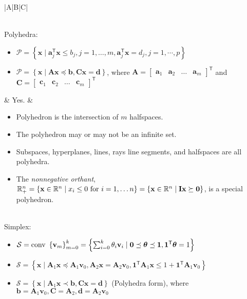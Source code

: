 \documentclass{article}
\newcommand{\trans}{\mathsf{T}}
\begin{document}
\begin{table}
\begin{tabularx}{\textwidth}{|A|B|C|}
\begin{itemize}[leftmargin=*]
\end{itemize} \\
\hline
Polyhedra:
\begin{itemize}[leftmargin=*]
    \item $\mathcal{P} = \left\{ \mathbf{x} \mid \mathbf{a}_j^\trans \mathbf{x} \leq b_j, j=1, \dots, m, \mathbf{a}_j^\trans \mathbf{x} = d_j, j=1,\cdots, p  \right\}$
    \item \(\mathcal{P} = \left\{ \mathbf{x} \mid \mathbf{Ax} \preceq \mathbf{b}, \mathbf{Cx} = \mathbf{d} \right\}\), where \(\mathbf{A} = \begin{bmatrix}
            \mathbf{a}_1 & \mathbf{a}_2 & \dots & \mathbf{a}_m
        \end{bmatrix}^\trans\) and \(\mathbf{C} = \begin{bmatrix}
            \mathbf{c}_1 & \mathbf{c}_2 & \dots & \mathbf{c}_m
        \end{bmatrix}^\trans\)
\end{itemize} & Yes. &
\begin{itemize}[leftmargin=*]
    \item Polyhedron is the intersection of \(m\) halfspaces.
    \item The polyhedron may or may not be an infinite set.
    \item Subspaces, hyperplanes, lines, rays line segments, and
    halfspaces are all polyhedra.
    \item The \emph{nonnegative orthant}, \(\mathbb{R}_{+}^{n} = \left\{ \mathbf{x} \in \mathbb{R}^n \mid x_i \leq 0 \textnormal{ for } i=1,\dots n \right\} = \left\{ \mathbf{x} \in \mathbb{R}^n \mid \mathbf{Ix}  \succeq \mathbf{0}\right\}\), is a special polyhedron.
\end{itemize}\\
\hline
Simplex:
\begin{itemize}[leftmargin=*]
    \item \(\mathcal{S} = \textnormal{conv }\left\{ \mathbf{v}_m \right\}_{m=0}^{k} = \left\{ \sum_{i=0}^{k} \theta_i \mathbf{v}_i \mid \mathbf{0} \preceq \boldsymbol{\theta} \preceq \mathbf{1}, \mathbf{1}^\trans \boldsymbol{\theta} = 1 \right\}\)
    \item \(\mathcal{S} = \left\{ \mathbf{x} \mid \mathbf{A}_1 \mathbf{x} \preceq \mathbf{A}_1 \mathbf{v}_0, \mathbf{A}_2 \mathbf{x} = \mathbf{A}_2 \mathbf{v}_0, \mathbf{1}^\trans \mathbf{A}_1 \mathbf{x} \leq 1 + \mathbf{1}^\trans\mathbf{A}_1 \mathbf{v}_0 \right\}\)
    \item \(\mathcal{S} = \left\{ \mathbf{x} \mid \mathbf{A}_1 \mathbf{x} \prec \mathbf{b}, \mathbf{Cx} = \mathbf{d} \right\}\) (Polyhedra form), where \(\mathbf{b} = \mathbf{A}_1 \mathbf{v}_0, \mathbf{C}=\mathbf{A}_2, \mathbf{d} = \mathbf{A}_2 \mathbf{v}_0\)

\end{itemize}
\end{tabularx}
\end{table}
\end{document}
